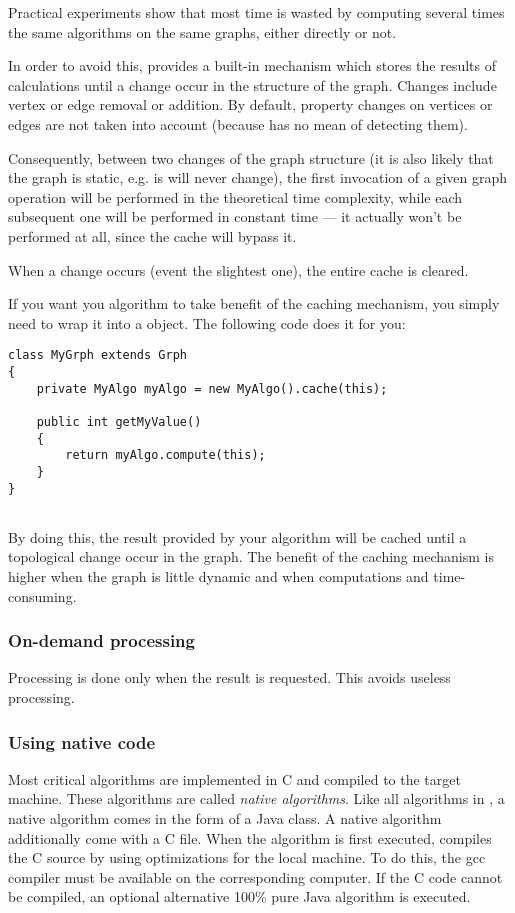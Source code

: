\documentclass{article}
\begin{document}
Practical experiments show that most time is wasted by computing several times the same
algorithms on the same graphs, either directly or not.

In order to avoid this, \grph provides a built-in mechanism which stores the
results of calculations until a change occur in the structure of the graph. Changes include
vertex or edge removal or addition. By default, property changes on vertices or edges are not
taken into account (because \grph has no mean of detecting them).

Consequently, between two changes of the graph structure (it is also likely that the graph
is static, e.g. is will never change), the first invocation of a given graph operation
will be performed in the theoretical time complexity, while each subsequent one will be
performed in constant time --- it actually won't be performed at all, since the cache will bypass it.

When a change occurs (event the slightest
one), the entire cache is cleared. 


If you want you algorithm to take benefit of the caching mechanism, you simply need to wrap it
into a   object. The following code does it for you:
\begin{lstlisting}
class MyGrph extends Grph
{
	private MyAlgo myAlgo = new MyAlgo().cache(this);
	
	public int getMyValue()
	{
		return myAlgo.compute(this);
	}
}
	
\end{lstlisting}By doing this, the result provided by your algorithm will be cached until a topological change occur in the graph.
The benefit of the caching mechanism is higher when the graph is little dynamic and when computations and time-consuming.


\subsubsection{On-demand processing}

Processing is done only when the result is requested. This avoids useless processing.


\subsubsection{Using native code}

Most critical algorithms are implemented in C and compiled to the target machine.
These algorithms are called {\em native algorithms}. Like all algorithms in \grph, a native algorithm
comes in the form of a Java class. A native algorithm additionally  come with a C file. When the algorithm 
is first executed, \grph compiles the C source by using optimizations for the local machine. To do this, the
gcc compiler must be available on the corresponding computer. If the C code cannot be compiled, an optional
alternative 100\% pure Java algorithm is executed.
\end{document}

